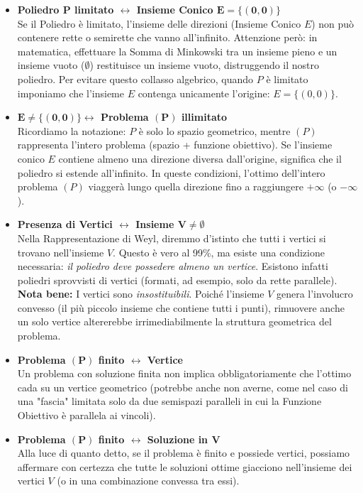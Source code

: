 \documentclass[12pt, a4paper]{article}
\begin{document}
	\begin{itemize}[label=\textcolor{titlecolor}{\Large\textbullet}, itemsep=8pt, parsep=2pt, leftmargin=1.5cm]
		\item \textbf{Poliedro $\boldsymbol{P}$ limitato $\longleftrightarrow$ Insieme Conico $\boldsymbol{E = \{(0,0)\}}$}\\
		Se il Poliedro è limitato, l'insieme delle direzioni (Insieme Conico $E$) non può contenere rette o semirette che vanno all'infinito. Attenzione però: in matematica, effettuare la Somma di Minkowski tra un insieme pieno e un insieme vuoto ($\emptyset$) restituisce un insieme vuoto, distruggendo il nostro poliedro. Per evitare questo collasso algebrico, quando $P$ è limitato imponiamo che l'insieme $E$ contenga unicamente l'origine: $E = \{(0,0)\}$.
		
		\item \textbf{$\boldsymbol{E \neq \{(0,0)\}} \longleftrightarrow$ Problema $\boldsymbol{(P)}$ illimitato}\\
		Ricordiamo la notazione: $P$ è solo lo spazio geometrico, mentre $(P)$ rappresenta l'intero problema (spazio + funzione obiettivo). Se l'insieme conico $E$ contiene almeno una direzione diversa dall'origine, significa che il poliedro si estende all'infinito. In queste condizioni, l'ottimo dell'intero problema $(P)$ viaggerà lungo quella direzione fino a raggiungere $+\infty$ (o $-\infty$).
		
		\item \textbf{Presenza di Vertici $\longleftrightarrow$ Insieme $\boldsymbol{V \neq \emptyset}$}\\
		Nella Rappresentazione di Weyl, diremmo d'istinto che tutti i vertici si trovano nell'insieme $V$. Questo è vero al 99\%, ma esiste una condizione necessaria: \textit{il poliedro deve possedere almeno un vertice}. Esistono infatti poliedri sprovvisti di vertici (formati, ad esempio, solo da rette parallele). \textbf{Nota bene:} I vertici sono \textit{insostituibili}. Poiché l'insieme $V$ genera l'involucro convesso (il più piccolo insieme che contiene tutti i punti), rimuovere anche un solo vertice altererebbe irrimediabilmente la struttura geometrica del problema.
		
		\item \textbf{Problema $\boldsymbol{(P)}$ finito $\longleftrightarrow$ Vertice}\\
		Un problema con soluzione finita non implica obbligatoriamente che l'ottimo cada su un vertice geometrico (potrebbe anche non averne, come nel caso di una "fascia" limitata solo da due semispazi paralleli in cui la Funzione Obiettivo è parallela ai vincoli).
		
		\item \textbf{Problema $\boldsymbol{(P)}$ finito $\longleftrightarrow$ Soluzione in $\boldsymbol{V}$}\\
		Alla luce di quanto detto, se il problema è finito e possiede vertici, possiamo affermare con certezza che tutte le soluzioni ottime giacciono nell'insieme dei vertici $V$ (o in una combinazione convessa tra essi).
	\end{itemize}
	
\end{document}
